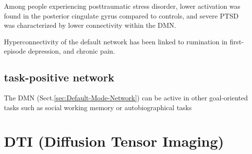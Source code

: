 Among people experiencing posttraumatic stress disorder, lower activation was
found in the posterior cingulate gyrus compared to controls, and severe PTSD was
characterized by lower connectivity within the DMN.


Hyperconnectivity of the default network has been linked to rumination in first-episode depression,
and chronic pain.







\subsection{task-positive network}
\label{sec:DMN-task-positive-network}

The DMN (Sect.\ref{sec:Default-Mode-Network}) can be active in other
goal-oriented tasks such as social working memory or autobiographical tasks




\section{DTI (Diffusion Tensor Imaging)}
\label{sec:DTI}

